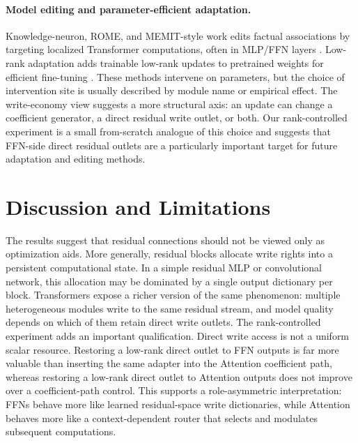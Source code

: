 \documentclass[letterpaper]{article}
\begin{document}
\paragraph{Model editing and parameter-efficient adaptation.}
Knowledge-neuron, ROME, and MEMIT-style work edits factual associations by
targeting localized Transformer computations, often in MLP/FFN layers
\citep{dai2022knowledge,meng2022locating,meng2023mass}. Low-rank adaptation
adds trainable low-rank updates to pretrained weights for efficient
fine-tuning \citep{hu2022lora}. These methods intervene on parameters, but the
choice of intervention site is usually described by module name or empirical
effect. The write-economy view suggests a more structural axis: an update can
change a coefficient generator, a direct residual write outlet, or both. Our
rank-controlled experiment is a small from-scratch analogue of this choice and
suggests that FFN-side direct residual outlets are a particularly important
target for future adaptation and editing methods.

\section{Discussion and Limitations}

The results suggest that residual connections should not be viewed only as
optimization aids. More generally, residual blocks allocate write rights into a
persistent computational state. In a simple residual MLP or convolutional
network, this allocation may be dominated by a single output dictionary per
block. Transformers expose a richer version of the same phenomenon: multiple
heterogeneous modules write to the same residual stream, and model quality
depends on which of them retain direct write outlets. The rank-controlled
experiment adds an important qualification. Direct write access is not a
uniform scalar resource. Restoring a low-rank direct outlet to FFN outputs is
far more valuable than inserting the same adapter into the Attention
coefficient path, whereas restoring a low-rank direct outlet to Attention
outputs does not improve over a coefficient-path control. This supports a
role-asymmetric interpretation: FFNs behave more like learned residual-space
write dictionaries, while Attention behaves more like a context-dependent
router that selects and modulates subsequent computations.
\end{document}
